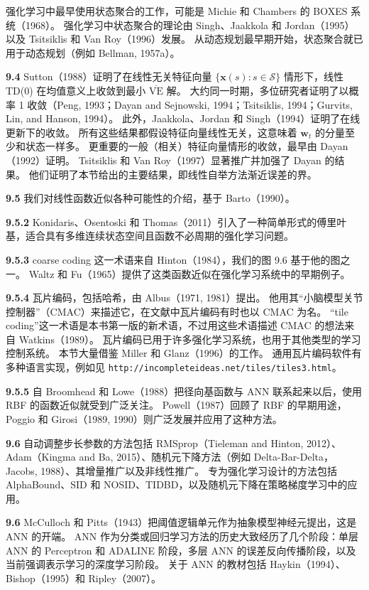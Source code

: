 \documentclass[UTF8,12pt,a4paper,fontset=fandol]{ctexart}
\begin{document}
强化学习中最早使用状态聚合的工作，可能是 Michie 和 Chambers 的 BOXES 系统（1968）。
强化学习中状态聚合的理论由 Singh、Jaakkola 和 Jordan（1995）以及 Tsitsiklis 和 Van Roy（1996）发展。
从动态规划最早期开始，状态聚合就已用于动态规划（例如 Bellman, 1957a）。

\noindent\textbf{9.4}
Sutton（1988）证明了在线性无关特征向量 $\{\mathbf{x}(s):s\in\mathcal{S}\}$ 情形下，线性 TD(0) 在均值意义上收敛到最小 $\overline{\mathrm{VE}}$ 解。
大约同一时期，多位研究者证明了以概率 1 收敛（Peng, 1993；Dayan and Sejnowski, 1994；Tsitsiklis, 1994；Gurvits, Lin, and Hanson, 1994）。
此外，Jaakkola、Jordan 和 Singh（1994）证明了在线更新下的收敛。
所有这些结果都假设特征向量线性无关，这意味着 $\mathbf{w}_t$ 的分量至少和状态一样多。
更重要的一般（相关）特征向量情形的收敛，最早由 Dayan（1992）证明。
Tsitsiklis 和 Van Roy（1997）显著推广并加强了 Dayan 的结果。
他们证明了本节给出的主要结果，即线性自举方法渐近误差的界。

\noindent\textbf{9.5}
我们对线性函数近似各种可能性的介绍，基于 Barto（1990）。

\noindent\textbf{9.5.2}
Konidaris、Osentoski 和 Thomas（2011）引入了一种简单形式的傅里叶基，适合具有多维连续状态空间且函数不必周期的强化学习问题。

\noindent\textbf{9.5.3}
coarse coding 这一术语来自 Hinton（1984），我们的图 9.6 基于他的图之一。
Waltz 和 Fu（1965）提供了这类函数近似在强化学习系统中的早期例子。

\noindent\textbf{9.5.4}
瓦片编码，包括哈希，由 Albus（1971, 1981）提出。
他用其“小脑模型关节控制器”（CMAC）来描述它，在文献中瓦片编码有时也以 CMAC 为名。
“tile coding”这一术语是本书第一版的新术语，不过用这些术语描述 CMAC 的想法来自 Watkins（1989）。
瓦片编码已用于许多强化学习系统，也用于其他类型的学习控制系统。
本节大量借鉴 Miller 和 Glanz（1996）的工作。
通用瓦片编码软件有多种语言实现，例如见 \texttt{http://incompleteideas.net/tiles/tiles3.html}。

\noindent\textbf{9.5.5}
自 Broomhead 和 Lowe（1988）把径向基函数与 ANN 联系起来以后，使用 RBF 的函数近似就受到广泛关注。
Powell（1987）回顾了 RBF 的早期用途，Poggio 和 Girosi（1989, 1990）则广泛发展并应用了这种方法。

\noindent\textbf{9.6}
自动调整步长参数的方法包括 RMSprop（Tieleman and Hinton, 2012）、Adam（Kingma and Ba, 2015）、随机元下降方法（例如 Delta-Bar-Delta，Jacobs, 1988）、其增量推广以及非线性推广。
专为强化学习设计的方法包括 AlphaBound、SID 和 NOSID、TIDBD，以及随机元下降在策略梯度学习中的应用。

\noindent\textbf{9.6}
McCulloch 和 Pitts（1943）把阈值逻辑单元作为抽象模型神经元提出，这是 ANN 的开端。
ANN 作为分类或回归学习方法的历史大致经历了几个阶段：单层 ANN 的 Perceptron 和 ADALINE 阶段，多层 ANN 的误差反向传播阶段，以及当前强调表示学习的深度学习阶段。
关于 ANN 的教材包括 Haykin（1994）、Bishop（1995）和 Ripley（2007）。
\end{document}
